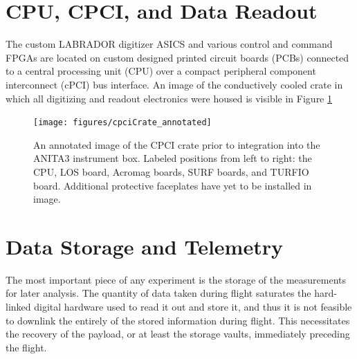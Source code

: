 \section{CPU, CPCI, and Data Readout}
	The custom LABRADOR digitizer ASICS and various control and command FPGAs are located on custom designed printed circuit boards (PCBs) connected to a central processing unit (CPU) over a compact peripheral component interconnect (cPCI) bus interface.  An image of the conductively cooled crate in which all digitizing and readout electronics were housed is visible in Figure \ref{fig:CPCIcrate}
	
\begin{figure}
	\centering
	\texttt{[image: figures/cpciCrate\_annotated]}
	\caption{An annotated image of the CPCI crate prior to integration into the ANITA3 instrument box.  Labeled positions from left to right: the CPU, LOS board, Acromag boards, SURF boards, and TURFIO board.  Additional protective faceplates have yet to be installed in image.}
	\label{fig:CPCIcrate}
\end{figure}
	
	
\section{Data Storage and Telemetry}
	The most important piece of any experiment is the storage of the measurements for later analysis.  The quantity of data taken during flight saturates the hard-linked digital hardware used to read it out and store it, and thus it is not feasible to downlink the entirely of the stored information during flight.  This necessitates the recovery of the payload, or at least the storage vaults, immediately preceding the flight.

